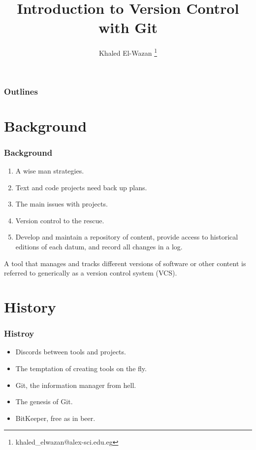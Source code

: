\documentclass[22pt]{beamer}
\title{Introduction to Version Control with Git \cite{loeliger2012version}}
\author{Khaled El-Wazan \thanks{khaled\_elwazan@alex-sci.edu.eg}}
\institute{Department of Mathematics and Computer Science, Faculty of Science, Alexandria University}
\date{}
\begin{document}
\Large
\maketitle


\begin{frame}
    \frametitle{Outlines}
    \tableofcontents
\end{frame}


\section{Background}

\begin{frame}
    \frametitle{Background}
    \begin{enumerate}
        \item A wise man strategies.
        \item Text and code projects need back up plans.
        \item The main issues with projects.
        \item Version control to the rescue.


              \pause
        \item Develop and maintain a repository of content, provide access to historical editions
              of each datum, and record all changes in a log.
    \end{enumerate}
    \pause
    \begin{definition}
        A tool that manages and tracks different versions of software or other content is referred
        to generically as a version control system (VCS).
    \end{definition}

\end{frame}


\section{History}
\begin{frame}
    \frametitle{Histroy}
    \begin{itemize}
        \item Discords between tools and projects.
        \item The temptation of creating tools on the fly.
        \item Git, the information manager from hell.
        \item The genesis of Git.
        \item BitKeeper, free as in beer.
    \end{itemize}


\end{frame}
\end{document}
